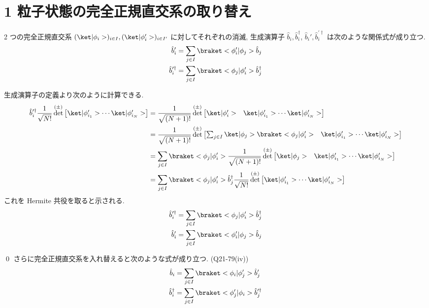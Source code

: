 \documentclass[uplatex,dvipdfmx,a4paper,11pt]{jlreq}
\makeatletter
\DeclareMathOperator{\Det}{det}
\numberwithin{equation}{section}
\theoremstyle{definition}
\renewenvironment{proof}[1][\proofname]{\par
  \normalfont
  \topsep6\p@\@plus6\p@ \trivlist
  \item[\hskip\labelsep{\bfseries #1}\@addpunct{\bfseries}]\ignorespaces\quad\par
}{
  \qed\endtrivlist\@endpefalse
}
\renewcommand\proofname{証明}
\makeatother
\begin{document}
\section{1 粒子状態の完全正規直交系の取り替え}
\begin{theorem}[Q21-79(i)(ii)(iii)]
  2 つの完全正規直交系 $(\ket|\phi_i>)_{i\in I}, (\ket|\phi_i'>)_{i\in I'}$ に対してそれぞれの消滅, 生成演算子 $\hat{b}_i, \hat{b}_i^\dagger$, $\hat{b}_i', \hat{b}_i^{\prime\dagger}$ は次のような関係式が成り立つ.
  \begin{align}
    \hat{b}_i'                & = \sum_{j\in I}\braket<\phi_i'|\phi_j>\hat{b}_j         \\
    \hat{b}_i^{\prime\dagger} & = \sum_{j\in I}\braket<\phi_j|\phi_i'>\hat{b}_j^\dagger
  \end{align}
\end{theorem}
\begin{proof}
  生成演算子の定義より次のように計算できる.
  \begin{align}
    \hat{b}_i^{\prime\dagger}\frac{1}{\sqrt{N!}}\Det^{(\pm)}\begin{bmatrix}\ket|\phi_{i_1}'>\cdots\ket|\phi_{i_N}'>\end{bmatrix}
     & = \frac{1}{\sqrt{(N+1)!}}\Det^{(\pm)}\begin{bmatrix}\ket|\phi_i'> & \ket|\phi_{i_1}'>\cdots\ket|\phi_{i_N}'>\end{bmatrix}                                    \\
     & = \frac{1}{\sqrt{(N+1)!}}\Det^{(\pm)}\begin{bmatrix}\sum_{j\in I}\ket|\phi_j>\braket<\phi_j|\phi_i'> & \ket|\phi_{i_1}'>\cdots\ket|\phi_{i_N}'>\end{bmatrix} \\
     & = \sum_{j\in I}\braket<\phi_j|\phi_i'>\frac{1}{\sqrt{(N+1)!}}\Det^{(\pm)}\begin{bmatrix}\ket|\phi_j> & \ket|\phi_{i_1}'>\cdots\ket|\phi_{i_N}'>\end{bmatrix} \\
     & = \sum_{j\in I}\braket<\phi_j|\phi_i'>\hat{b}_j^\dagger\frac{1}{\sqrt{N!}}\Det^{(\pm)}\begin{bmatrix}\ket|\phi_{i_1}'>\cdots\ket|\phi_{i_N}'>\end{bmatrix}
  \end{align}
  これを
  Hermite 共役を取ると示される.
  \begin{align}
    \hat{b}_i^{\prime\dagger} & = \sum_{j\in I}\braket<\phi_j|\phi_i'>\hat{b}_j^\dagger \\
    \hat{b}_i^{\prime}        & = \sum_{j\in I}\braket<\phi_i'|\phi_j>\hat{b}_j
  \end{align}
\end{proof}
さらに完全正規直交系を入れ替えると次のような式が成り立つ. (Q21-79(iv))
\begin{align}
  \hat{b}_i         & = \sum_{j\in I}\braket<\phi_i|\phi_j'>\hat{b}_j'                \\
  \hat{b}_i^\dagger & = \sum_{j\in I}\braket<\phi_j'|\phi_i>\hat{b}_j^{\prime\dagger}
\end{align}
\end{document}
